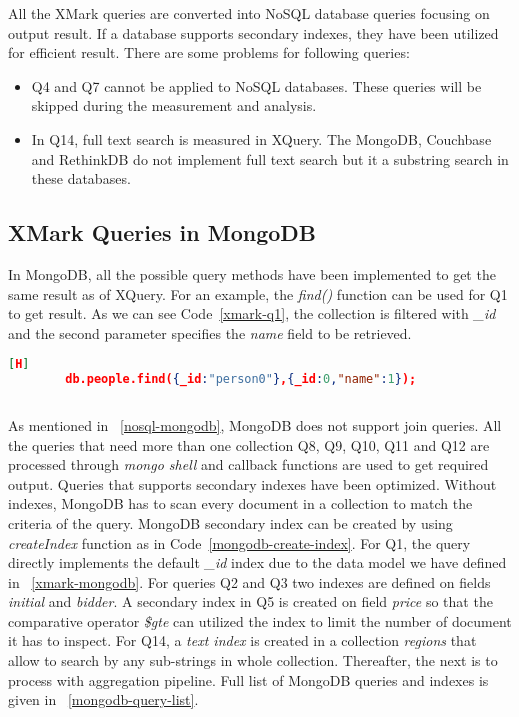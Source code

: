 All the XMark queries are converted into NoSQL database queries focusing  on output result. If a database supports secondary indexes, they have been utilized for efficient result. There are some problems for following queries:
\begin{itemize}
\item Q4 and Q7 cannot be applied to NoSQL databases. These queries will be skipped during the measurement and analysis. 
\item In Q14, full text search is measured in XQuery. The MongoDB, Couchbase and RethinkDB do not implement full text search but it a substring search in these databases. 
\end{itemize}

\subsection{XMark Queries in MongoDB}

In MongoDB, all the possible query methods have been implemented to get the same result as of XQuery.  For an example, the \textit{find()} function can be used for Q1 to get result. As we can see Code~\ref{xmark-q1}, the collection is filtered with \textit{\_id}  and the second parameter specifies the \textit{name} field to be retrieved.  
\begin{lstlisting}[language=JSON, caption=XMark Query Q1 in MongoDB, label=xmark-q1, basicstyle=\scriptsize][H]
		db.people.find({_id:"person0"},{_id:0,"name":1});
		
\end{lstlisting}
As mentioned in ~\ref{nosql-mongodb}, MongoDB does not support join queries. All the queries that need more than one collection  Q8, Q9, Q10, Q11 and Q12  are processed through \textit{mongo shell} and  callback functions are used  to get required output. Queries that supports secondary indexes have been optimized. Without indexes, MongoDB has to scan every document in a collection to match the criteria of the query. MongoDB secondary index can be created by using \textit{createIndex} function as in Code~\ref{mongodb-create-index}.
For Q1, the query directly implements the default \textit{\_id} index due to the data model we have defined in ~\ref{xmark-mongodb}. For queries Q2 and Q3 two indexes are defined on fields \textit{initial} and \textit{bidder}.  A secondary index in Q5 is created on field \textit{price} so that the comparative operator \textit{\$gte} can utilized the index to limit the number of document it has to inspect. For Q14, a \textit{text index} is created in a collection \textit{regions} that allow to search by any sub-strings in whole collection. Thereafter, the next is to process with aggregation pipeline. Full  list of MongoDB queries and indexes is  given in ~\ref{mongodb-query-list}.

